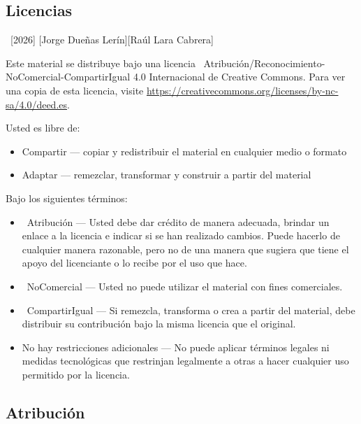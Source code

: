 \documentclass[
    a4paper, %
    12pt, %
]{CSSullivanBusinessReport}
\begin{document}
\begin{twothirdswidth} %
    \footnotesize %
    
    \subsection*{Licencias}
    
    \textcopyright~[2026] [Jorge Dueñas Lerín][Raúl Lara Cabrera] 
    
    Este material se distribuye bajo una licencia \ccbyncsaeu~Atribución/Reconocimiento-NoComercial-CompartirIgual 4.0 Internacional de Creative Commons. Para ver una copia de esta licencia, visite \url{https://creativecommons.org/licenses/by-nc-sa/4.0/deed.es}. 
    
    Usted es libre de:
    \begin{itemize}
        \item Compartir — copiar y redistribuir el material en cualquier medio o formato
        \item Adaptar — remezclar, transformar y construir a partir del material
    \end{itemize}
    Bajo los siguientes términos:
    \begin{itemize}
        \item \ccAttribution~Atribución — Usted debe dar crédito de manera adecuada, brindar un enlace a la licencia e indicar si se han realizado cambios. Puede hacerlo de cualquier manera razonable, pero no de una manera que sugiera que tiene el apoyo del licenciante o lo recibe por el uso que hace.
        \item \ccNonCommercialEU~NoComercial — Usted no puede utilizar el material con fines comerciales.
        \item \ccShareAlike~CompartirIgual — Si remezcla, transforma o crea a partir del material, debe distribuir su contribución bajo la misma licencia que el original.
        \item No hay restricciones adicionales — No puede aplicar términos legales ni medidas tecnológicas que restrinjan legalmente a otras a hacer cualquier uso permitido por la licencia.
    \end{itemize}

    \subsection*{Atribución}


\end{twothirdswidth}
\end{document}
